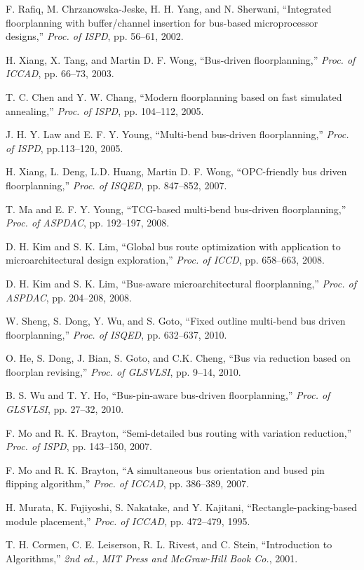 F. Rafiq, M. Chrzanowska-Jeske, H. H. Yang, and N. Sherwani,
``Integrated floorplanning with buffer/channel insertion for
bus-based microprocessor designs,'' {\it Proc. of ISPD}, pp.
56--61, 2002.

H. Xiang, X. Tang, and Martin D. F. Wong, ``Bus-driven
floorplanning,'' {\it Proc. of ICCAD}, pp. 66--73, 2003.

T. C. Chen and Y. W. Chang, ``Modern floorplanning based on fast simulated
annealing,'' {\it Proc. of ISPD}, pp. 104--112, 2005.

J. H. Y. Law and E. F. Y. Young, ``Multi-bend bus-driven
floorplanning,'' {\it Proc. of ISPD}, pp.113--120, 2005.

H. Xiang, L. Deng, L.D. Huang, Martin D. F. Wong,
``OPC-friendly bus driven floorplanning,''
{\it Proc. of ISQED}, pp. 847--852, 2007.

T. Ma and E. F. Y. Young, ``TCG-based multi-bend bus-driven
floorplanning,'' {\it Proc. of ASPDAC}, pp. 192--197, 2008.

D. H. Kim and S. K. Lim,
``Global bus route optimization with application to microarchitectural design exploration,''
{\it Proc. of ICCD}, pp. 658--663, 2008.

D. H. Kim and S. K. Lim,
``Bus-aware microarchitectural floorplanning,''
{\it Proc. of ASPDAC}, pp. 204--208, 2008.

W. Sheng, S. Dong, Y. Wu, and S. Goto,
``Fixed outline multi-bend bus driven floorplanning,''
{\it Proc. of ISQED}, pp. 632--637, 2010.

O. He, S. Dong, J. Bian, S. Goto, and C.K. Cheng,
``Bus via reduction based on floorplan revising,''
{\it Proc. of GLSVLSI}, pp. 9--14, 2010.

B. S. Wu and T. Y. Ho,
``Bus-pin-aware bus-driven floorplanning,''
{\it Proc. of GLSVLSI}, pp. 27--32, 2010.

F. Mo and R. K. Brayton, ``Semi-detailed bus routing with
variation reduction,'' {\it Proc. of ISPD}, pp. 143--150, 2007.

F. Mo and R. K. Brayton, ``A simultaneous bus orientation and
bused pin flipping algorithm,'' {\it Proc. of ICCAD}, pp.
386--389, 2007.

H. Murata, K. Fujiyoshi, S. Nakatake, and Y. Kajitani,
``Rectangle-packing-based module placement,'' {\it Proc. of
ICCAD}, pp. 472--479, 1995.

T. H. Cormen, C. E. Leiserson, R. L. Rivest, and C. Stein,
``Introduction to Algorithms,'' {\it 2nd ed., MIT Press and
McGraw-Hill Book Co.}, 2001.